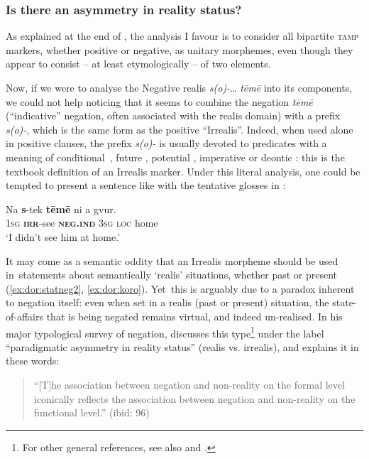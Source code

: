 \documentclass[output=paper,colorlinks,citecolor=brown,draft]{langscibook}
\begin{document}
\subsubsection{Is there an asymmetry in reality status?}\label{sec:dor:2.1.5}

As explained at the end of , the analysis I favour is to consider all bipartite \textsc{tamp} markers, whether positive or negative, as unitary morphemes, even though they appear to consist – at least etymologically – of two elements.

Now, if we were to analyse the Negative realis \textit{s(o)-}… \textit{tēmē} into its components, we could not help noticing that it seems to combine the negation \textit{tēmē} (“indicative” negation, often associated with the realis domain) with a prefix \textit{s(o)-}, which is the same form as the positive “Irrealis”. Indeed, when used alone in positive clauses, the prefix \textit{s(o)-} is usually devoted to predicates with a meaning of conditional~, future , potential , imperative  or deontic : this is the textbook definition of an Irrealis marker. Under this literal analysis, one could be tempted to present a sentence like  with the tentative glosses in :

\ea\label{ex:dor:perfneg} 
    \gll  Na \textbf{s}-tek \textbf{tēmē} ni a gvur.\\ 
          \textsc{1sg} \textbf{\textsc{irr}}-see \textbf{\textsc{neg.ind}} \textsc{3sg} \textsc{loc} home\\
    \glt ‘I didn’t see him at home.’
\z 

It may come as a semantic oddity that an Irrealis morpheme should be used in~statements about semantically ‘realis’ situations, whether past  or present (\ref{ex:dor:statneg2}, \ref{ex:dor:koro}). Yet~this is arguably due to a paradox inherent to negation itself: even when set in a realis (past or present) situation, the state-of-affairs that is being negated remains virtual, and indeed un-realised. In his major typological survey of negation, \citet[96]{Miestamo2005} discusses this type\footnote{For other general references, see also \citet{Elliott2000} and \citet{Cristofaro2012}.} under the label “paradigmatic asymmetry in reality status” (realis vs. irrealis), and explains it in these words: 

\begin{quote}
    “[T]he association between negation and non-reality on the formal level iconically reflects the association between negation and non-reality on the functional level.” (ibid: 96)
\end{quote}
\end{document}

